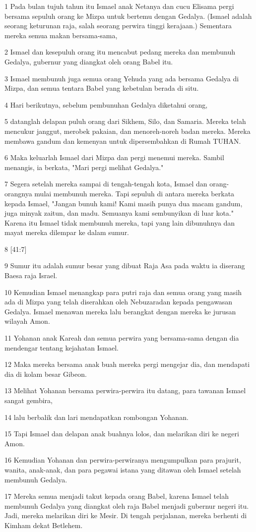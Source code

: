\par 1 Pada bulan tujuh tahun itu Ismael anak Netanya dan cucu Elisama pergi bersama sepuluh orang ke Mizpa untuk bertemu dengan Gedalya. (Ismael adalah seorang keturunan raja, salah seorang perwira tinggi kerajaan.) Sementara mereka semua makan bersama-sama,
\par 2 Ismael dan kesepuluh orang itu mencabut pedang mereka dan membunuh Gedalya, gubernur yang diangkat oleh orang Babel itu.
\par 3 Ismael membunuh juga semua orang Yehuda yang ada bersama Gedalya di Mizpa, dan semua tentara Babel yang kebetulan berada di situ.
\par 4 Hari berikutnya, sebelum pembunuhan Gedalya diketahui orang,
\par 5 datanglah delapan puluh orang dari Sikhem, Silo, dan Samaria. Mereka telah mencukur janggut, merobek pakaian, dan menoreh-noreh badan mereka. Mereka membawa gandum dan kemenyan untuk dipersembahkan di Rumah TUHAN.
\par 6 Maka keluarlah Ismael dari Mizpa dan pergi menemui mereka. Sambil menangis, ia berkata, "Mari pergi melihat Gedalya."
\par 7 Segera setelah mereka sampai di tengah-tengah kota, Ismael dan orang-orangnya mulai membunuh mereka. Tapi sepuluh di antara mereka berkata kepada Ismael, "Jangan bunuh kami! Kami masih punya dua macam gandum, juga minyak zaitun, dan madu. Semuanya kami sembunyikan di luar kota." Karena itu Ismael tidak membunuh mereka, tapi yang lain dibunuhnya dan mayat mereka dilempar ke dalam sumur.
\par 8 [41:7]
\par 9 Sumur itu adalah sumur besar yang dibuat Raja Asa pada waktu ia diserang Baesa raja Israel.
\par 10 Kemudian Ismael menangkap para putri raja dan semua orang yang masih ada di Mizpa yang telah diserahkan oleh Nebuzaradan kepada pengawasan Gedalya. Ismael menawan mereka lalu berangkat dengan mereka ke jurusan wilayah Amon.
\par 11 Yohanan anak Kareah dan semua perwira yang bersama-sama dengan dia mendengar tentang kejahatan Ismael.
\par 12 Maka mereka bersama anak buah mereka pergi mengejar dia, dan mendapati dia di kolam besar Gibeon.
\par 13 Melihat Yohanan bersama perwira-perwira itu datang, para tawanan Ismael sangat gembira,
\par 14 lalu berbalik dan lari mendapatkan rombongan Yohanan.
\par 15 Tapi Ismael dan delapan anak buahnya lolos, dan melarikan diri ke negeri Amon.
\par 16 Kemudian Yohanan dan perwira-perwiranya mengumpulkan para prajurit, wanita, anak-anak, dan para pegawai istana yang ditawan oleh Ismael setelah membunuh Gedalya.
\par 17 Mereka semua menjadi takut kepada orang Babel, karena Ismael telah membunuh Gedalya yang diangkat oleh raja Babel menjadi gubernur negeri itu. Jadi, mereka melarikan diri ke Mesir. Di tengah perjalanan, mereka berhenti di Kimham dekat Betlehem.

